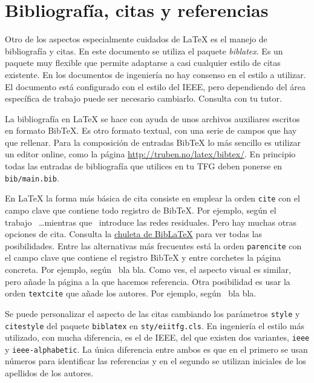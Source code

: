 \section{Bibliografía, citas y referencias} 
\label{sec:bibliografia-citas}

Otro de los aspectos especialmente cuidados de \LaTeX{} es el manejo de bibliografía y citas.  En este documento se utiliza el paquete \emph{biblatex}.  Es un paquete muy flexible que permite adaptarse a casi cualquier estilo de citas existente.  En los documentos de ingeniería no hay consenso en el estilo a utilizar.  El documento está configurado con el estilo del IEEE, pero dependiendo del área específica de trabajo puede ser necesario cambiarlo. Consulta con tu tutor.

La bibliografía en \LaTeX{} se hace con ayuda de unos archivos auxiliares escritos en formato BibTeX.  Es otro formato textual, con una serie de campos que hay que rellenar.  Para la composición de entradas BibTeX lo más sencillo es utilizar un editor online, como la página \url{http://truben.no/latex/bibtex/}.  En principio todas las entradas de bibliografía que utilices en tu TFG deben ponerse en \texttt{bib/main.bib}.

En \LaTeX{} la forma más básica de cita consiste en emplear la orden \texttt{cite} con el campo clave que contiene todo registro de BibTeX.  Por ejemplo, según el trabajo~\cite{dosovitskiy2021vit} \ldots mientras que~\cite{he2016resnet} introduce las redes residuales.  Pero hay muchas otras opciones de cita.  Consulta la \href{http://tug.ctan.org/info/biblatex-cheatsheet/biblatex-cheatsheet.pdf}{chuleta de Bib\LaTeX} para ver todas las posibilidades.  Entre las alternativas más frecuentes está la orden \texttt{parencite} con el campo clave que contiene el registro BibTeX y entre corchetes la página concreta.  Por ejemplo, según~\parencite[3]{dosovitskiy2021vit} bla bla.  Como ves, el aspecto visual es similar, pero añade la página a la que hacemos referencia.  Otra posibilidad es usar la orden \texttt{textcite} que añade los autores.  Por ejemplo, según~\textcite{dosovitskiy2021vit} bla bla.

Se puede personalizar el aspecto de las citas cambiando los parámetros \texttt{style} y \texttt{citestyle} del paquete \texttt{biblatex} en \texttt{sty/eiitfg.cls}.  En ingeniería el estilo más utilizado, con mucha diferencia, es el de IEEE, del que existen dos variantes, \texttt{ieee} y \texttt{ieee-alphabetic}.  La única diferencia entre ambos es que en el primero se usan números para identificar las referencias y en el segundo se utilizan iniciales de los apellidos de los autores.

